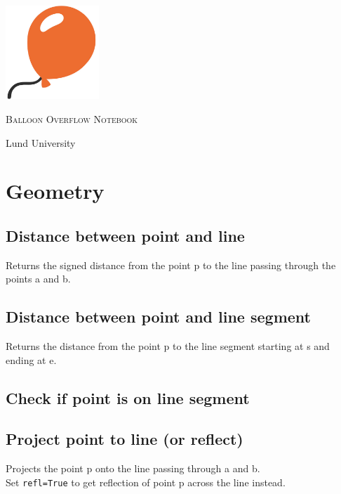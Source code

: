 \documentclass{article}
\begin{document}
\begin{titlepage}
  \centering
  \vspace*{\fill}
  \includegraphics[width=100pt]{balloon.jpg}\\
  \vspace{0.5cm}
  {\scshape\Huge Balloon Overflow Notebook \par}
  \vspace{1cm}
  {\LARGE\color{black!75} Lund University \par}
  \vspace*{\fill}
\end{titlepage}

\section*{Geometry}



\subsection*{Distance between point and line}
Returns the signed distance from the point p to the line passing through the points a and b.


\subsection*{Distance between point and line segment}
Returns the distance from the point p to the line segment starting at s and ending at e.


\subsection*{Check if point is on line segment}


\subsection*{Project point to line (or reflect)}
Projects the point p onto the line passing through a and b.\\
Set \lstinline{refl=True} to get reflection of point p across the line instead.

\end{document}
